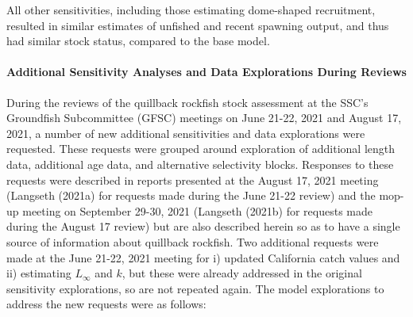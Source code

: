\documentclass[11pt,
  english,
  letterpaper,
]{article}
\begin{document}
\leavevmode\tagmcend\tagstructend\par


All other sensitivities, including those estimating dome-shaped recruitment, resulted in similar estimates of unfished and recent spawning output, and thus had similar stock status, compared to the base model.

\leavevmode\tagmcend\tagstructend\par


\hypertarget{additional-sensitivity-analyses-and-data-explorations-during-reviews}{%
\paragraph{Additional Sensitivity Analyses and Data Explorations During Reviews}\label{additional-sensitivity-analyses-and-data-explorations-during-reviews}}

\leavevmode\tagmcend\tagstructend


During the reviews of the quillback rockfish stock assessment at the SSC's Groundfish Subcommittee (GFSC) meetings on June 21-22, 2021 and August 17, 2021, a number of new additional sensitivities and data explorations were requested. These requests were grouped around exploration of additional length data, additional age data, and alternative selectivity blocks. Responses to these requests were described in reports presented at the August 17, 2021 meeting (Langseth {(2021a)\leavevmode\tagmcend\tagstructend} for requests made during the June 21-22 review) and the mop-up meeting on September 29-30, 2021 (Langseth {(2021b)\leavevmode\tagmcend\tagstructend} for requests made during the August 17 review) but are also described herein so as to have a single source of information about quillback rockfish. Two additional requests were made at the June 21-22, 2021 meeting for i) updated California catch values and ii) estimating {\(L_{\infty}\)\leavevmode\tagmcend\tagstructend} and {\(k\)\leavevmode\tagmcend\tagstructend}, but these were already addressed in the original sensitivity explorations, so are not repeated again. The model explorations to address the new requests were as follows:
\end{document}
